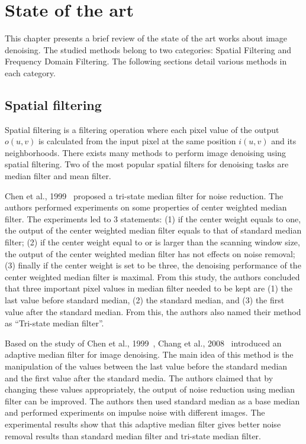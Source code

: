 \chapter{State of the art}
\label{chapter_2}

This chapter presents a brief review of the state of the art works about image denoising. The studied methods belong to two categories: Spatial Filtering and Frequency Domain Filtering. The following sections detail various methods in each category.

%
\section{Spatial filtering}

Spatial filtering is a filtering operation where each pixel value of the output $o(u,v)$ is calculated from the input pixel at the same position $i(u,v)$ and its neighborhoods. There exists many methods to perform image denoising using spatial filtering. Two of the most popular spatial filters for denoising tasks are median filter and mean filter. 

Chen et al., 1999~\cite{chen1999tri} proposed a tri-state median filter for noise reduction. The authors performed experiments on some properties of center weighted median filter. The experiments led to 3 statements: (1) if the center weight  equals to one, the output of the center weighted median filter equals to that of standard median filter; (2) if the center weight equal to or is larger than the scanning window size, the output of the center weighted median filter has not effects on noise removal; (3) finally if the center weight is set to be three, the denoising performance of the center weighted median filter is maximal. From this study, the authors concluded that three important pixel values in median filter needed to be kept are (1) the last value before standard median, (2) the standard median, and (3) the first value after the standard median. From this, the authors also named their method as ``Tri-state median filter''.

Based on the study of Chen et al., 1999~\cite{chen1999tri}, Chang et al., 2008~\cite{chang2008adaptive} introduced an adaptive median filter for image denoising. The main idea of this method is the manipulation of the values between the last value before the standard median and the first value after the standard media. The authors claimed that by changing these values appropriately, the output of noise reduction using median filter can be improved. The authors then used standard median as a base median and performed experiments on impulse noise with different images. The experimental results show that this adaptive median filter gives better noise removal results than standard median filter and tri-state median filter.

